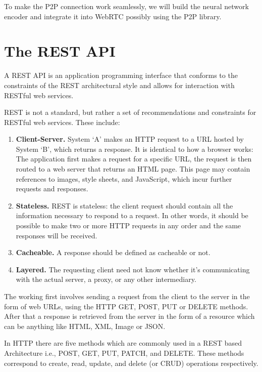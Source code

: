 To make the P2P connection work seamlessly, we will build the neural network encoder and
 integrate it into WebRTC possibly using the P2P library.

 \section{The REST API}

 A REST API is an application programming interface that conforms to the constraints of the REST 
 architectural style and allows for interaction with RESTful web services.

REST is not a standard, but rather a set of recommendations and constraints for
 RESTful web services. These include:

 \begin{enumerate}
     \item \textbf{Client-Server.} System ‘A’ makes an HTTP request to a URL hosted by 
     System ‘B’, which returns a response.
     It is identical to how a browser works: The application first makes a request 
     for a specific URL, the request is then routed to a web server that returns an HTML page. 
     This page may contain references to images, style sheets, and JavaScript, 
     which incur further requests and responses.

     \item \textbf{Stateless.} REST is stateless: the client request should contain all the 
     information necessary to respond to a request. In other words, it should be possible to
      make two or more HTTP requests in any order and the same responses will be received.

      \item \textbf{Cacheable.} A response should be defined as cacheable or not.
      
      \item \textbf{Layered.} The requesting client need not know whether it’s communicating 
      with the actual server, a proxy, or any other intermediary.
     
 \end{enumerate}

 The working first involves sending a request from the client to the server in the form of web URLs, 
 using the HTTP GET, POST, PUT or DELETE methods. After that a response is retrieved from the server 
 in the form of a resource which can be anything like HTML, XML, Image or JSON.

 In HTTP there are five methods which are commonly used in a REST based Architecture i.e.,
  POST, GET, PUT, PATCH, and DELETE. These methods correspond to create, read, update, and delete
   (or CRUD) operations respectively.

